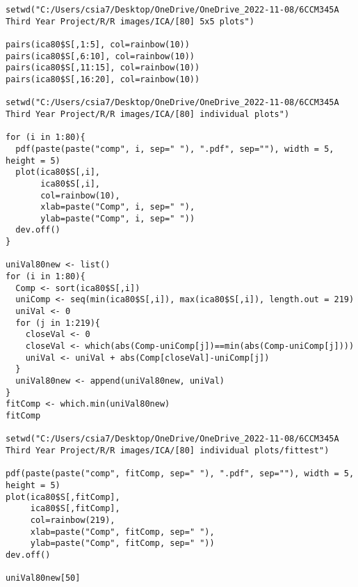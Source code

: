 \begin{verbatim}
setwd("C:/Users/csia7/Desktop/OneDrive/OneDrive_2022-11-08/6CCM345A Third Year Project/R/R images/ICA/[80] 5x5 plots")

pairs(ica80$S[,1:5], col=rainbow(10))
pairs(ica80$S[,6:10], col=rainbow(10))
pairs(ica80$S[,11:15], col=rainbow(10))
pairs(ica80$S[,16:20], col=rainbow(10))

setwd("C:/Users/csia7/Desktop/OneDrive/OneDrive_2022-11-08/6CCM345A Third Year Project/R/R images/ICA/[80] individual plots")

for (i in 1:80){
  pdf(paste(paste("comp", i, sep=" "), ".pdf", sep=""), width = 5, height = 5) 
  plot(ica80$S[,i],
       ica80$S[,i], 
       col=rainbow(10), 
       xlab=paste("Comp", i, sep=" "), 
       ylab=paste("Comp", i, sep=" "))
  dev.off()
}

uniVal80new <- list()
for (i in 1:80){
  Comp <- sort(ica80$S[,i])
  uniComp <- seq(min(ica80$S[,i]), max(ica80$S[,i]), length.out = 219)
  uniVal <- 0
  for (j in 1:219){
    closeVal <- 0
    closeVal <- which(abs(Comp-uniComp[j])==min(abs(Comp-uniComp[j])))
    uniVal <- uniVal + abs(Comp[closeVal]-uniComp[j])
  }
  uniVal80new <- append(uniVal80new, uniVal)
}
fitComp <- which.min(uniVal80new)
fitComp

setwd("C:/Users/csia7/Desktop/OneDrive/OneDrive_2022-11-08/6CCM345A Third Year Project/R/R images/ICA/[80] individual plots/fittest")

pdf(paste(paste("comp", fitComp, sep=" "), ".pdf", sep=""), width = 5, height = 5) 
plot(ica80$S[,fitComp],
     ica80$S[,fitComp], 
     col=rainbow(219), 
     xlab=paste("Comp", fitComp, sep=" "), 
     ylab=paste("Comp", fitComp, sep=" "))
dev.off()

uniVal80new[50]
\end{verbatim}